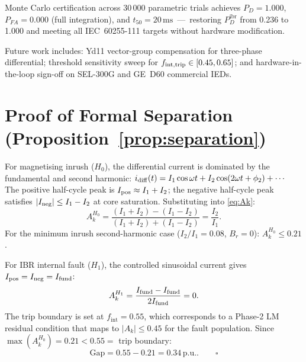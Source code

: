 \documentclass[journal,twoside,10pt]{IEEEtran}
\newcommand{\pu}{\,\text{p.u.}}
\newcommand{\ms}{\,\text{ms}}
\newcommand{\fint}{f_{\mathrm{int}}}
\newcommand{\Ak}{A_k}
\newcommand{\Pdibr}{P_D^{\mathrm{ibr}}}
\begin{document}
Monte Carlo certification across 30\,000 parametric trials achieves
$P_D = 1.000$, $P_{FA} = 0.000$ (full integration), and
$t_{50} = 20\ms$~---~restoring $\Pdibr$ from 0.236 to 1.000 and
meeting all IEC~60255-111 targets without hardware modification.

Future work includes: Yd11 vector-group compensation for three-phase
differential; threshold sensitivity sweep for
$f_{\rm int,trip} \in [0.45, 0.65]$; and hardware-in-the-loop sign-off
on SEL-300G and GE~D60 commercial IEDs.

\appendix
\section{Proof of Formal Separation (Proposition~\ref{prop:separation})}
\label{app:separation}

For magnetising inrush ($H_0$), the differential current is dominated
by the fundamental and second harmonic:
$i_{\rm diff}(t) = I_1\cos\omega t + I_2\cos(2\omega t + \phi_2) + \cdots$
The positive half-cycle peak is $I_{\rm pos} \approx I_1 + I_2$;
the negative half-cycle peak satisfies $|I_{\rm neg}| \leq I_1 - I_2$
at core saturation.
Substituting into \eqref{eq:Ak}:
\begin{equation}
  \Ak^{H_0} = \frac{(I_1+I_2) - (I_1-I_2)}{(I_1+I_2) + (I_1-I_2)}
             = \frac{I_2}{I_1}.
  \label{eq:Ak_H0}
\end{equation}
For the minimum inrush second-harmonic case ($I_2/I_1 = 0.08$, $B_r = 0$):
$\Ak^{H_0} \leq 0.21$.

For IBR internal fault ($H_1$), the controlled sinusoidal current gives
$I_{\rm pos} = I_{\rm neg} = I_{\rm fund}$:
\begin{equation}
  \Ak^{H_1} = \frac{I_{\rm fund} - I_{\rm fund}}{2I_{\rm fund}} = 0.
  \label{eq:Ak_H1}
\end{equation}
The trip boundary is set at $\fint = 0.55$, which corresponds to a
Phase-2 LM residual condition that maps to $|\Ak| \leq 0.45$ for the
fault population.
Since $\max(\Ak^{H_0}) = 0.21 < 0.55 = $ trip boundary:
\begin{equation}
  \text{Gap} = 0.55 - 0.21 = 0.34\pu. \qquad \square
  \label{eq:gap}
\end{equation}



\end{document}
